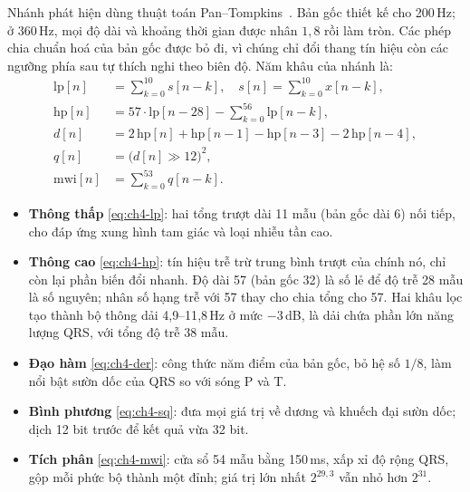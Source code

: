 Nhánh phát hiện dùng thuật toán Pan--Tompkins~\cite{pantompkins1985realtime}.
Bản gốc thiết kế cho 200\,Hz; ở 360\,Hz, mọi độ dài và khoảng thời gian được nhân $1{,}8$ rồi làm tròn.
Các phép chia chuẩn hoá của bản gốc được bỏ đi, vì chúng chỉ đổi thang tín hiệu còn các ngưỡng phía sau tự thích nghi theo biên độ.
Năm khâu của nhánh là:
\begin{align}
  \mathrm{lp}[n]&=\sum_{k=0}^{10}s[n-k],\quad s[n]=\sum_{k=0}^{10}x[n-k], \label{eq:ch4-lp}\\
  \mathrm{hp}[n]&=57\cdot\mathrm{lp}[n-28]-\sum_{k=0}^{56}\mathrm{lp}[n-k], \label{eq:ch4-hp}\\
  d[n]&=2\,\mathrm{hp}[n]+\mathrm{hp}[n-1]-\mathrm{hp}[n-3]-2\,\mathrm{hp}[n-4], \label{eq:ch4-der}\\
  q[n]&=\big(d[n]\gg12\big)^{2}, \label{eq:ch4-sq}\\
  \mathrm{mwi}[n]&=\sum_{k=0}^{53}q[n-k]. \label{eq:ch4-mwi}
\end{align}
\begin{itemize}
  \item \textbf{Thông thấp} \eqref{eq:ch4-lp}: hai tổng trượt dài 11 mẫu (bản gốc dài 6) nối tiếp, cho đáp ứng xung hình tam giác và loại nhiễu tần cao.
  \item \textbf{Thông cao} \eqref{eq:ch4-hp}: tín hiệu trễ trừ trung bình trượt của chính nó, chỉ còn lại phần biến đổi nhanh.
  Độ dài 57 (bản gốc 32) là số lẻ để độ trễ 28 mẫu là số nguyên; nhân số hạng trễ với 57 thay cho chia tổng cho 57.
  Hai khâu lọc tạo thành bộ thông dải 4{,}9--11{,}8\,Hz ở mức $-3$\,dB, là dải chứa phần lớn năng lượng QRS, với tổng độ trễ 38 mẫu.
  \item \textbf{Đạo hàm} \eqref{eq:ch4-der}: công thức năm điểm của bản gốc, bỏ hệ số $1/8$, làm nổi bật sườn dốc của QRS so với sóng P và T.
  \item \textbf{Bình phương} \eqref{eq:ch4-sq}: đưa mọi giá trị về dương và khuếch đại sườn dốc; dịch 12 bit trước để kết quả vừa 32 bit.
  \item \textbf{Tích phân} \eqref{eq:ch4-mwi}: cửa sổ 54 mẫu bằng 150\,ms, xấp xỉ độ rộng QRS, gộp mỗi phức bộ thành một đỉnh; giá trị lớn nhất $2^{29{,}3}$ vẫn nhỏ hơn $2^{31}$.
\end{itemize}

